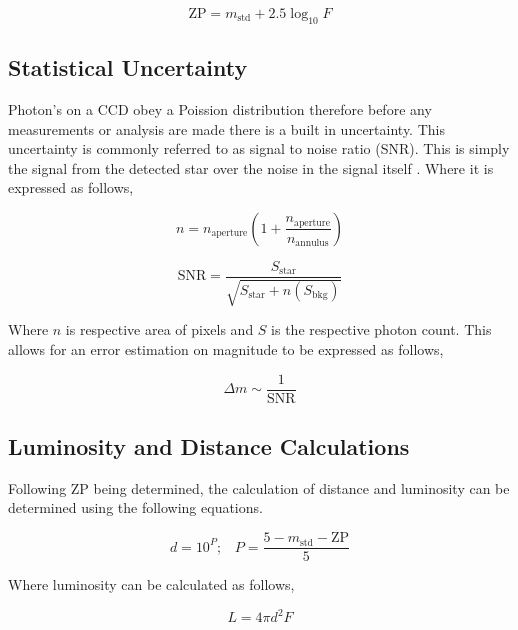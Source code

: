 \begin{equation}
    \text{ZP} = m_{\text{std}} + 2.5 \log_{10} F 
\end{equation}

\subsection{Statistical Uncertainty}

Photon's on a CCD obey a Poission distribution therefore before any measurements or analysis are made there is a built in uncertainty. This uncertainty is commonly referred to as signal to noise ratio (SNR). This is simply the signal from the detected star over the noise in the signal itself \citep[Ch. 5.3]{budding_o_2007}. Where it is expressed as follows, 

\begin{equation}
    n = n_{\text{aperture}}  \left( 1 + \frac{n_{\text{aperture}}}{n_{\text{annulus}}} \right)
\end{equation}

\begin{equation}
    \text{SNR} = \frac{S_{\text{star}}}{\sqrt{S_{\text{star}} +  n\left(S_{\text{bkg}}  \right)}}
\end{equation}

Where $n$ is respective area of pixels and $S$ is the respective photon count. This allows for an error estimation on magnitude to be expressed as follows, 

\begin{equation}
    \Delta m \sim \frac{1}{\text{SNR}}
\end{equation}

\subsection{Luminosity and Distance Calculations}

Following ZP being determined, the calculation of distance and luminosity can be determined using the following equations. 

\begin{equation}
    d = 10^{P}; \; \; \; P = \frac{5 - m_{\text{std}} - \text{ZP} }{5}
\end{equation}

Where luminosity can be calculated as follows, 

\begin{equation}
    L = 4\pi d^2 F
\end{equation}


